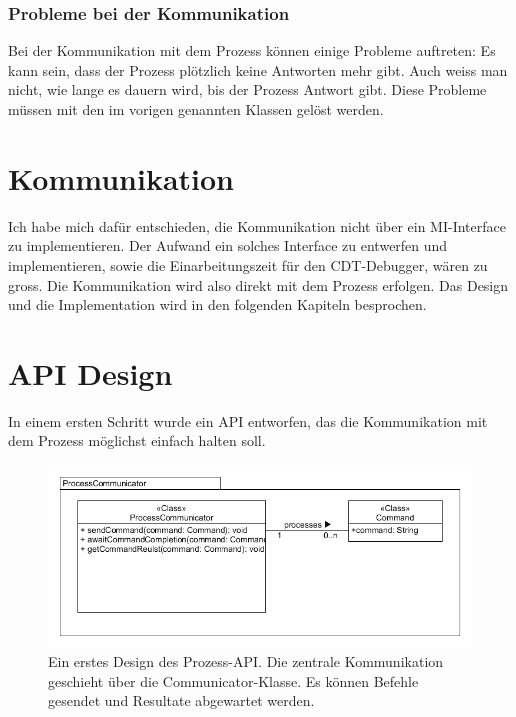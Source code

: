 \subsubsection{Probleme bei der Kommunikation}

Bei der Kommunikation mit dem Prozess können einige Probleme auftreten: Es kann sein, dass der Prozess plötzlich keine Antworten mehr gibt. Auch weiss man nicht, wie lange es dauern wird, bis der Prozess Antwort gibt. Diese Probleme müssen mit den im vorigen genannten Klassen gelöst werden.

\section{Kommunikation}

Ich habe mich dafür entschieden, die Kommunikation nicht über ein MI-Interface zu implementieren. Der Aufwand ein solches Interface zu entwerfen und implementieren, sowie die Einarbeitungszeit für den CDT-Debugger, wären zu gross. Die Kommunikation wird also direkt mit dem Prozess erfolgen. Das Design und die Implementation wird in den folgenden Kapiteln besprochen.

\section{API Design}

In einem ersten Schritt wurde ein API entworfen, das die Kommunikation mit dem Prozess möglichst einfach halten soll.

\begin{figure}[H]
	\centering
		\includegraphics[scale=0.6]{forthcommunication/api.png}
		\caption{Ein erstes Design des Prozess-API. Die zentrale Kommunikation geschieht über die Communicator-Klasse. Es können Befehle gesendet und Resultate abgewartet werden.}
		\label{fig:api}
\end{figure}

